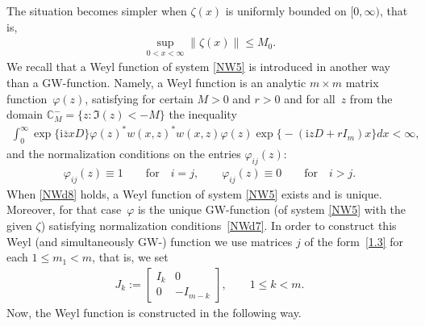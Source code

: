 \documentclass[pdftex]{sigma}
\def\vp{\varphi}
\def\BC{{\mathbb C}}
\newcommand{\I}{\mathrm{i}}
\numberwithin{equation}{section}
\begin{document}
The situation becomes simpler when
$\zeta(x)$ is uniformly bounded on $[0, \infty)$, that is,
\begin{gather}
  \sup\limits_{0 < x < \infty}
   \bigl\| \zeta (x) \bigr\|
 \leq M_0 .
 \label{NWd8}
\end{gather}
We recall that  a Weyl function of system \eqref{NW5} is introduced in another way
than a GW-function. Namely, a Weyl function
 is an analytic $m \times m$ matrix function~$\varphi (z)$,
satisfying for certain
$M > 0$
and
$r > 0$
and for all~$z$
from the domain
$\BC^{-}_M = \{ z \colon \Im(z) < - M \}$
the inequality
\begin{gather}
  \int_0^\infty
      \exp \{\I \overline z x D \}
     \varphi (z)^*
     w (x,z)^*
     w (x,z)
     \varphi (z)
     \exp
      \bigl\{{-}
        (\I z D + r I_m )x
      \bigr\}
  dx
 < \infty,
 \label{NWd6}
\end{gather}
and the normalization conditions on the entries $\varphi_{ij} (z)$:
\begin{gather}
   \varphi_{ij} (z) \equiv 1 \qquad \mbox{for} \quad i= j, \qquad
   \varphi_{ij} (z) \equiv 0 \qquad \mbox{for} \quad i > j.
 \label{NWd7}
\end{gather}
When \eqref{NWd8} holds,
a Weyl function of system \eqref{NW5} exists and is unique.
Moreover, for that case~$\vp$ is the unique GW-function (of system \eqref{NW5} with the given $\zeta$)
satisfying normalization conditions~\eqref{NWd7}. In order to construct this Weyl (and simultaneously GW-) function
we use matrices $j$ of the form~\eqref{1.3} for each $1\leq m_1 < m$, that is, we set
\begin{gather*}
J_k:= \left[
     \begin{matrix}
       I_k & 0   \\
       0 & -I_{m-k}
     \end{matrix}
    \right], \qquad   1\leq k < m.
\end{gather*}
Now, the Weyl function is constructed \cite[pp.~103--106]{SaSaR}
in the following way.
\end{document}
